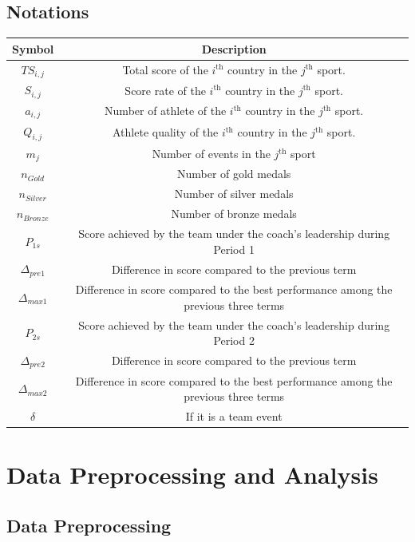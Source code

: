 \documentclass[12pt]{article}
\begin{document}
\subsection{Notations}
\begin{table}[h!]
\centering 
\renewcommand{\arraystretch}{1.5}
\begin{tabular}{cc} 
\toprule
Symbol & Description \\
\midrule
$TS_{i,j}$ & Total score of the $i^{\text{th}}$ country in the $j^{\text{th}}$ sport.\\
$S_{i,j}$ & Score rate of the $i^{\text{th}}$ country in the $j^{\text{th}}$ sport.\\
$a_{i,j}$ & Number of athlete of the $i^{\text{th}}$ country in the $j^{\text{th}}$ sport.\\
$Q_{i,j}$ & Athlete quality of the $i^{\text{th}}$ country in the $j^{\text{th}}$ sport. \\
$m_j$ & Number of events in the $j^{\text{th}}$ sport\\
$n_{Gold}$ & Number of gold medals \\
$n_{Silver}$ & Number of silver medals \\
$n_{Bronze}$ & Number of bronze medals \\
$P_{1s}$ & Score achieved by the team under the coach's leadership during Period 1 \\
$\Delta_{pre1}$ & Difference in score compared to the previous term \\
$\Delta_{max1}$ & Difference in score compared to the best performance among the previous three terms \\
$P_{2s}$ & Score achieved by the team under the coach's leadership during Period 2 \\
$\Delta_{pre2}$& Difference in score compared to the previous term \\
$\Delta_{max2}$ & Difference in score compared to the best performance among the previous three terms \\
$\delta$ & If it is a team event\\
\bottomrule
\end{tabular}
\label{tab:symbols_descriptions}
\end{table}

\section{Data Preprocessing and Analysis}
\subsection{Data Preprocessing}
\end{document}
